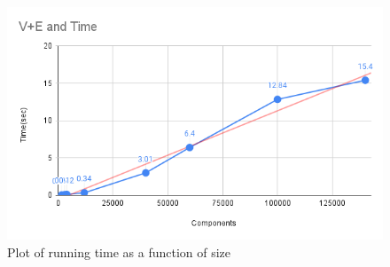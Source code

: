 \documentclass[12pt,letterpaper, onecolumn]{exam}
\begin{document}
        \begin{figure}
            \centering
            \includegraphics[width=14cm]{chart1.png}
            \caption{Plot of running time as a function of size}
            \label{fig:galaxy}
        \end{figure}
    \pagebreak %
    
\end{document}
